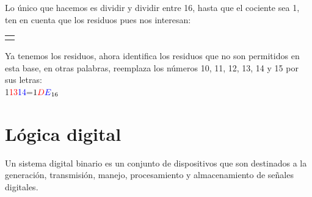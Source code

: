 \documentclass[
	12pt, %
	fleqn, %
	a4paper, %
	oneside, %
]{LegrandOrangeBook}
\begin{document}
\def\basetenconversiontable#1#2{%
    \begin{tikzpicture}[every node/.style={minimum width=1cm, minimum height=0.5cm}, x=1cm,y=0.5cm]
    \total=#1%
    \targetbase=#2
    \def\newnumber{}
    \pgfmathloop
    \ifnum\total<1
    \else
        \ifnum\pgfmathcounter>1
            \node at (\pgfmathcounter, -\pgfmathcounter+1) (tmp) {\the\targetbase};
            \draw (tmp.north west) |- (tmp.south east);
            \node at (\pgfmathcounter-1, -\pgfmathcounter) (tmp) {\pgfmathparse{int(\total*\targetbase)}\pgfmathresult};
            \draw (tmp.south west) -- (tmp.south east);
            \pgfmathparse{int(\lasttotal-\total*\targetbase)}%
            \let\digit=\pgfmathresult
            \node at (\pgfmathcounter-1, -\pgfmathcounter-1) [text=red] {\digit};
            \edef\newnumber{\digit\newnumber}
        \fi
        \ifnum\total<\targetbase
                \edef\newnumber{\the\total\newnumber}
            \node at (\pgfmathcounter, -\pgfmathcounter) [text=red]  {\the\total};
        \else
            \node at (\pgfmathcounter, -\pgfmathcounter) {\the\total};
        \fi
        \lasttotal=\total
        \divide\total by\targetbase
    \repeatpgfmathloop    
    \draw [->] (\pgfmathcounter-1,-\pgfmathcounter-1) -- ++(-0.5,0); 
    \node [anchor=west] at (1, -\pgfmathcounter-2) {$#1=\newnumber_{\the\targetbase}$};
    \end{tikzpicture}   
}
\begin{example}
Lo único que hacemos es dividir y dividir entre 16, hasta que el cociente sea 1, ten en cuenta que los residuos pues nos interesan:
\begin{center}
\begin{tabular}{c}
\basetenconversiontable{478}{16}
\end{tabular}
\end{center}
Ya tenemos los residuos, ahora identifica los residuos que no son permitidos en esta base, en otras palabras, reemplaza los números 10, 11, 12, 13, 14 y 15 por sus letras:\\
1\textcolor{red}{13}\textcolor{blue}{14}=$1\textcolor{red}{D}\textcolor{blue}{E}_{16}$
\end{example}
\chapter{Lógica digital}
Un sistema digital binario es un conjunto de dispositivos que son destinados a la generación, transmisión, manejo, procesamiento y almacenamiento de señales digitales.
\end{document}
